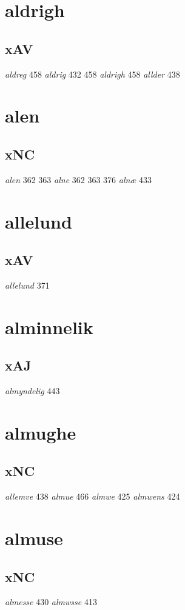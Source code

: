 \documentclass[a4paper,twocolumn]{article}
\begin{document}
\section{aldrigh}
\label{sec:orga65c60a}
\subsection{xAV}
\label{sec:org7b9f448}
\emph{aldreg} 458 \emph{aldrig} 432 458 \emph{aldrigh} 458 \emph{allder} 438 
\section{alen}
\label{sec:orgbc9429a}
\subsection{xNC}
\label{sec:org0724649}
\emph{alen} 362 363 \emph{alne} 362 363 376 \emph{alnæ} 433 
\section{allelund}
\label{sec:org2408bba}
\subsection{xAV}
\label{sec:orgc484436}
\emph{allelund} 371 
\section{alminnelik}
\label{sec:org61918d4}
\subsection{xAJ}
\label{sec:org556e610}
\emph{almyndelig} 443 
\section{almughe}
\label{sec:orgf34790f}
\subsection{xNC}
\label{sec:org8a5d7c2}
\emph{allemve} 438 \emph{almue} 466 \emph{almwe} 425 \emph{almwens} 424 
\section{almuse}
\label{sec:org2a4cf2a}
\subsection{xNC}
\label{sec:org579c290}
\emph{almesse} 430 \emph{almwsse} 413 
\end{document}
